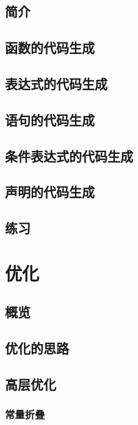 \documentclass[cn,11pt,chinese]{elegantbook}
\begin{document}
\section{简介}

\section{函数的代码生成}

\section{表达式的代码生成}

\section{语句的代码生成}

\section{条件表达式的代码生成}

\section{声明的代码生成}

\section{练习}

\chapter{优化}

\section{概览}

\section{优化的思路}

\section{高层优化}

\subsection{常量折叠}
\end{document}
